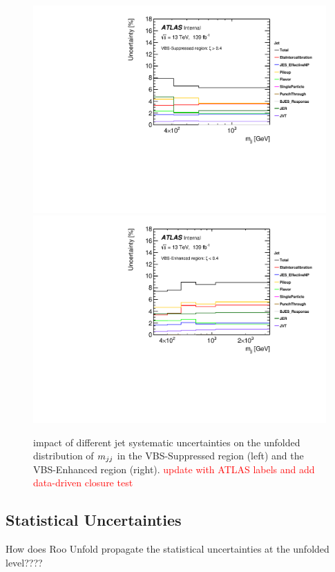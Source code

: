 \begin{figure}[!htb]
\centering
\includegraphics[width=.49\linewidth]{figures/Analysis/Systematics/jet_systematics_VBS_Suppressed.pdf}
\includegraphics[width=.49\linewidth]{figures/Analysis/Systematics/jet_systematics_VBS_Enhanced.pdf}
\caption{impact of different jet systematic uncertainties on the unfolded distribution of $m_{jj}$ in the VBS-Suppressed region (left) and the VBS-Enhanced region (right). \textcolor{red}{update with ATLAS labels and add data-driven closure test}  \label{fig:jet_systematics_mjj}}
\end{figure}

\subsection{Statistical Uncertainties}
\label{subsubsec:StatUnc}
How does Roo Unfold propagate the statistical uncertainties at the unfolded level???? 

